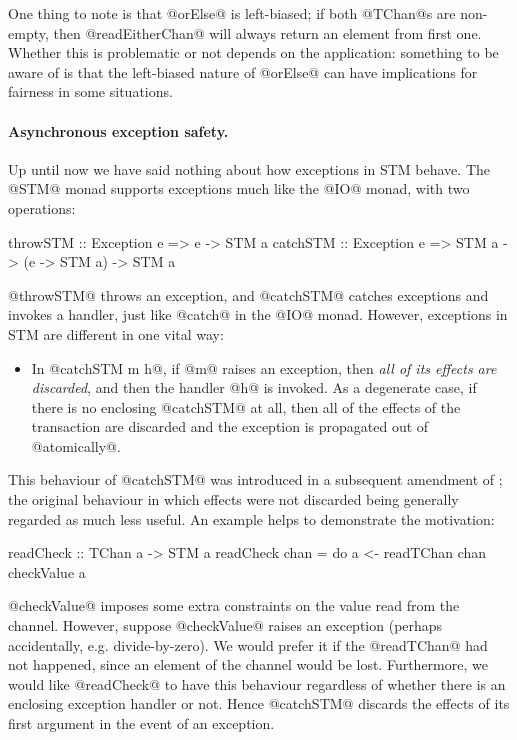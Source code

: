 One thing to note is that @orElse@ is left-biased; if both @TChan@s
are non-empty, then @readEitherChan@ will always return an element
from first one.  Whether this is problematic or not depends on the
application: something to be aware of is that the left-biased nature
of @orElse@ can have implications for fairness in some situations.

\paragraph{Asynchronous exception safety.} Up until now we have said
nothing about how exceptions in STM behave.  The @STM@ monad supports
exceptions much like the @IO@ monad, with two operations:

\begin{haskell}
throwSTM  :: Exception e => e -> STM a
catchSTM  :: Exception e => STM a -> (e -> STM a) -> STM a
\end{haskell}

\noindent @throwSTM@ throws an exception, and @catchSTM@ catches
exceptions and invokes a handler, just like @catch@ in the @IO@ monad.
However, exceptions in STM are different in one vital way:

\begin{itemize}
\item In @catchSTM m h@, if @m@ raises an exception, then \emph{all of
  its effects are discarded}, and then the handler @h@ is invoked.  As
  a degenerate case, if there is no enclosing @catchSTM@ at all, then
  all of the effects of the transaction are discarded and the
  exception is propagated out of @atomically@.
\end{itemize}

\noindent This behaviour of @catchSTM@ was introduced in a subsequent
amendment of \citet{stm}; the original behaviour in which effects were
not discarded being generally regarded as much less useful.  An
example helps to demonstrate the motivation:

\begin{haskell}
readCheck :: TChan a -> STM a
readCheck chan = do
  a <- readTChan chan
  checkValue a
\end{haskell}

\noindent @checkValue@ imposes some extra constraints on the value
read from the channel.  However, suppose @checkValue@ raises an
exception (perhaps accidentally, e.g. divide-by-zero).  We would
prefer it if the @readTChan@ had not happened, since an element of the
channel would be lost.  Furthermore, we would like @readCheck@ to have
this behaviour regardless of whether there is an enclosing exception
handler or not.  Hence @catchSTM@ discards the effects of its first
argument in the event of an exception.

